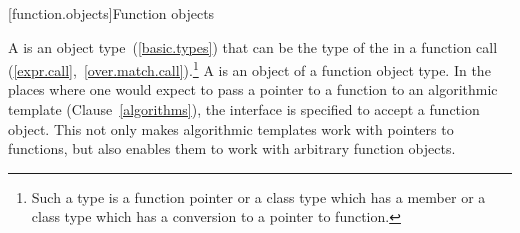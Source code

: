 [function.objects]{Function objects}

\pnum
A  is an object
type~(\ref{basic.types}) that can be the type of the
 in a function call
(\ref{expr.call},~\ref{over.match.call}).\footnote{Such a type is a function
pointer or a class type which has a member  or a class type
which has a conversion to a pointer to function.} A  is an
object of a function object type. In the places where one would expect to pass a
pointer to a function to an algorithmic template (Clause~\ref{algorithms}), the
interface is specified to accept a function object. This not only makes
algorithmic templates work with pointers to functions, but also enables them to
work with arbitrary function objects.

\pnum
{}

